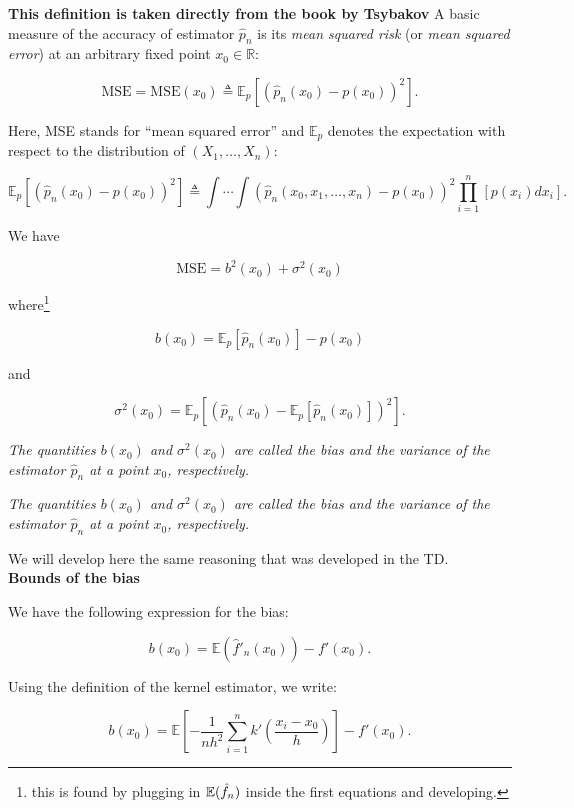 \documentclass{article}
\begin{document}
\textbf{This definition is taken directly from the book by Tsybakov}
A basic measure of the accuracy of estimator $\hat{p}_n$ is its \textit{mean squared risk} (or \textit{mean squared error}) at an arbitrary fixed point $x_0 \in \mathbb{R}$:

\[
\text{MSE} = \text{MSE}(x_0) \triangleq \mathbb{E}_p \left[ \left( \hat{p}_n(x_0) - p(x_0) \right)^2 \right].
\]

Here, MSE stands for “mean squared error” and $\mathbb{E}_p$ denotes the expectation with respect to the distribution of $(X_1, \dots, X_n)$:

\[
\mathbb{E}_p \left[ \left( \hat{p}_n(x_0) - p(x_0) \right)^2 \right] \triangleq \int \cdots \int \left( \hat{p}_n(x_0, x_1, \dots, x_n) - p(x_0) \right)^2 \prod_{i=1}^n \left[ p(x_i) dx_i \right].
\]

We have 

\[
\text{MSE} = b^2(x_0) + \sigma^2(x_0)
\tag{1.4}
\]

where\footnote{this is found by plugging in \(\mathbb{E}(\hat{f}_n)\) inside the first equations and developing.}

\[
b(x_0) = \mathbb{E}_p[\hat{p}_n(x_0)] - p(x_0)
\]

and 

\[
\sigma^2(x_0) = \mathbb{E}_p \left[ \left( \hat{p}_n(x_0) - \mathbb{E}_p[\hat{p}_n(x_0)] \right)^2 \right].
\]

\begin{definition}
    \textit{The quantities $b(x_0)$ and $\sigma^2(x_0)$ are called the bias and the variance of the estimator $\hat{p}_n$ at a point $x_0$, respectively.}

\end{definition}

\textit{The quantities $b(x_0)$ and $\sigma^2(x_0)$ are called the bias and the variance of the estimator $\hat{p}_n$ at a point $x_0$, respectively.}

We will develop here the same reasoning that was developed in the TD. \\

\textbf{Bounds of the bias}

We have the following expression for the bias:

\[
b(x_0) = \mathbb{E}\left(\hat{f}'_n(x_0)\right) - f'(x_0).
\]

Using the definition of the kernel estimator, we write:

\[
b(x_0) = \mathbb{E}\left[-\frac{1}{n h^2} \sum_{i=1}^n k'\left(\frac{x_i - x_0}{h}\right)\right] - f'(x_0).
\]
\end{document}
